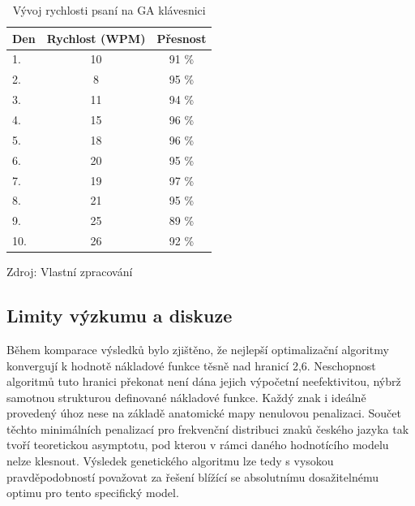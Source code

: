 \documentclass[a4paper, twoside, 12pt, czech]{article}
\begin{document}
\begin{table}[H]
    \centering
    \caption{Vývoj rychlosti psaní na GA klávesnici}
    \vspace{0.5cm}
\begin{tabular}{|l|c|c|}
\hline
\textbf{Den} & \multicolumn{1}{l|}{\textbf{Rychlost (WPM)}} & \multicolumn{1}{l|}{\textbf{Přesnost}} \\ \hline
1.           & 10                                           & 91 \%                                   \\ \hline
2.           & 8                                            & 95 \%                                   \\ \hline
3.           & 11                                           & 94 \%                                   \\ \hline
4.           & 15                                           & 96 \%                                   \\ \hline
5.           & 18                                           & 96 \%                                   \\ \hline
6.           & 20                                           & 95 \%                                   \\ \hline
7.           & 19                                           & 97 \%                                   \\ \hline
8.           & 21                                           & 95 \%                                   \\ \hline
9.           & 25                                           & 89 \%                                   \\ \hline
10.          & 26                                           & 92 \%                                   \\ \hline
\end{tabular}
\label{table:wpm}

\vspace{0.5cm}
\small{Zdroj: Vlastní zpracování}
\end{table}

\subsection{Limity výzkumu a diskuze}
Během komparace výsledků bylo zjištěno, že nejlepší optimalizační algoritmy 
konvergují k hodnotě nákladové funkce těsně nad hranicí 2,6. Neschopnost algoritmů 
tuto hranici překonat není dána jejich výpočetní neefektivitou, nýbrž samotnou 
strukturou definované nákladové funkce. Každý znak i ideálně provedený úhoz nese 
na základě anatomické mapy nenulovou penalizaci. Součet těchto minimálních penalizací 
pro frekvenční distribuci znaků českého jazyka tak tvoří teoretickou asymptotu, 
pod kterou v rámci daného hodnotícího modelu nelze klesnout. Výsledek genetického 
algoritmu lze tedy s vysokou pravděpodobností po\-važovat za řešení blížící se 
absolutnímu dosažitelnému optimu pro tento specifický model.
\end{document}
